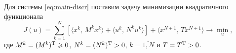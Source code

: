 Для системы \eqref{eq:main-discr} поставим задачу минимизации квадратичного функционала
\begin{equation}\label{eq:main-discr-1}
        J(u) = \sum\limits_{k = 1}^{N}
        \left[
\langle
x^k,\,M^k x^k
\rangle
+
\langle
u^k,\,N^k u^k
\rangle
        \right]
        +
        \langle
        x^{N+1}
        ,\,
        T x^{N+1}
        \rangle
        \to \min\limits_{u},
\end{equation}
где $M^k = (M^k)^\mathrm{T} \geqslant 0$, $N^k = (N^k)^\mathrm{T} > 0$, $k = \overline{1,N}$ и  $T = T^\mathrm{T} > 0$.